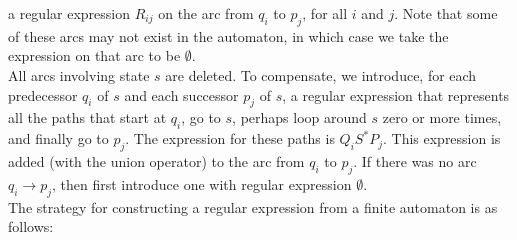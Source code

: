 \documentclass[]{article}
\begin{document}
    a regular expression $R_{ij}$ on the arc from $q_i$ to $p_j$, for all $i$
    and $j$. Note that some of these arcs may not exist in the automaton, in
    which case we take the expression on that arc to be $\emptyset$. \\
    \indent All arcs involving state $s$ are deleted. To compensate, we
    introduce, for each predecessor $q_i$ of $s$ and each successor $p_j$ of
    $s$, a regular expression that represents all the paths that start at $q_i$,
    go to $s$, perhaps loop around $s$ zero or more times, and finally go to
    $p_j$. The expression for these paths is $Q_iS^*P_j$. This expression is
    added (with the union operator) to the arc from $q_i$ to $p_j$. If there was
    no arc $q_i \rightarrow p_j$, then first introduce one with regular
    expression $\emptyset$. \\
    \indent The strategy for constructing a regular expression from a finite
    automaton is as follows:
\end{document}
